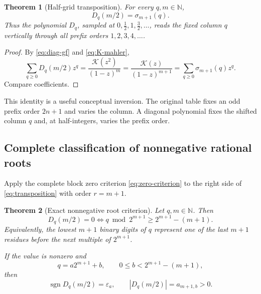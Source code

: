\documentclass[11pt]{article}
\newtheorem{theorem}{Theorem}[section]
\theoremstyle{definition}
\theoremstyle{remark}
\newcommand{\N}{\mathbb N}
\newcommand{\eps}{\varepsilon}
\newcommand{\K}{\mathcal K}
\newcommand{\Diag}{D}
\begin{document}
\begin{theorem}[Half-grid transposition]\label{thm:transposition}
For every \(q,m\in\N\),
\begin{equation}
 \boxed{\Diag_q(m/2)=\sigma_{m+1}(q).}                     \label{eq:transposition}
\end{equation}
Thus the polynomial \(\Diag_q\), sampled at
\(0,\tfrac12,1,\tfrac32,\ldots\), reads the fixed column \(q\) vertically
through all prefix orders \(1,2,3,4,\ldots\).
\end{theorem}

\begin{proof}
By \cref{eq:diag-gf} and \cref{eq:K-mahler},
\[
 \sum_{q\geq0}\Diag_q(m/2)z^q
 =\frac{\K(z^2)}{(1-z)^m}
 =\frac{\K(z)}{(1-z)^{m+1}}
 =\sum_{q\geq0}\sigma_{m+1}(q)z^q.
\]
Compare coefficients.
\end{proof}

This identity is a useful conceptual inversion.  The original table fixes an
odd prefix order \(2n+1\) and varies the column.  A diagonal polynomial fixes
the shifted column \(q\) and, at half-integers, varies the prefix order.

\subsection{Complete classification of nonnegative rational roots}

Apply the complete block zero criterion \cref{eq:zero-criterion} to the right
side of \cref{eq:transposition} with order \(r=m+1\).

\begin{theorem}[Exact nonnegative root criterion]\label{thm:root-criterion}
Let \(q,m\in\N\).  Then
\begin{equation}
 \boxed{
 \Diag_q(m/2)=0
 \iff
 q\bmod 2^{m+1}\geq2^{m+1}-(m+1).}                         \label{eq:root-criterion}
\end{equation}
Equivalently, the lowest \(m+1\) binary digits of \(q\) represent one of the
last \(m+1\) residues before the next multiple of \(2^{m+1}\).

If the value is nonzero and
\[
 q=a2^{m+1}+b,
 \qquad 0\leq b<2^{m+1}-(m+1),
\]
then
\begin{equation}
 \operatorname{sgn}\Diag_q(m/2)=\eps_a,
 \qquad
 |\Diag_q(m/2)|=a_{m+1,b}>0.                               \label{eq:half-grid-sign}
\end{equation}
\end{theorem}
\end{document}
